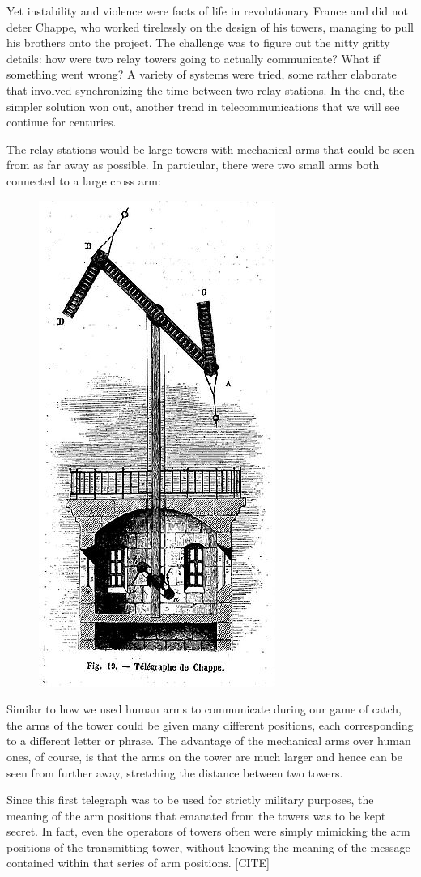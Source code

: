 \documentclass[UTF8]{book}
\begin{document}
\begin{CJK}{UTF8}{gbsn}
Yet instability and violence were facts of life in revolutionary France and did not deter Chappe, who worked tirelessly on the design of his towers, managing to pull his brothers onto the project. The challenge was to figure out the nitty gritty details: how were two relay towers going to actually communicate? What if something went wrong? A variety of systems were tried, some rather elaborate that involved synchronizing the time between two relay stations. In the end, the simpler solution won out, another trend in telecommunications that we will see continue for centuries.

The relay stations would be large towers with mechanical arms that could be seen from as far away as possible. In particular, there were two small arms both connected to a large cross arm:

\begin{figure}[H]
\centering
\includegraphics[width=0.3\linewidth]{chappe_tower}
\end{figure}

Similar to how we used human arms to communicate during our game of catch, the arms of the tower could be given many different positions, each corresponding to a different letter or phrase. The advantage of the mechanical arms over human ones, of course, is that the arms on the tower are much larger and hence can be seen from further away, stretching the distance between two towers.

Since this first telegraph was to be used for strictly military purposes, the meaning of the arm positions that emanated from the towers was to be kept secret. In fact, even the operators of towers often were simply mimicking the arm positions of the transmitting tower, without knowing the meaning of the message contained within that series of arm positions. [CITE]


\end{CJK}
\end{document}
